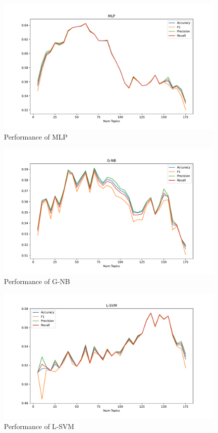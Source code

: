 \documentclass[sigconf, nonacm]{acmart}
\begin{document}
\begin{figure}[h]
	\centering
	\includegraphics[width=\linewidth, trim={2cm 0.7cm 2cm 1.6cm}, clip]{figures/40k/evaluation_mlp.pdf}
	\caption{Performance of MLP}
	\label{fig:p_mlp}
\end{figure}

\begin{figure}[h]
	\centering
	\includegraphics[width=\linewidth, trim={2cm 0.7cm 2cm 1.6cm}, clip]{figures/40k/evaluation_g-nb.pdf}
	\caption{Performance of G-NB}
	\label{fig:p_gnb}
\end{figure}

\begin{figure}[h]
	\centering
	\includegraphics[width=\linewidth, trim={2cm 0.7cm 2cm 1.6cm}, clip]{figures/40k/evaluation_l-svm.pdf}
	\caption{Performance of L-SVM}
	\label{fig:p_lsvm}
\end{figure}
\end{document}
